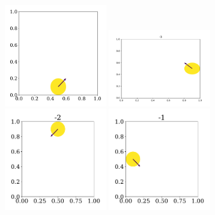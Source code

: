 \documentclass{article}
\begin{document}
    \begin{figure}[H]
        \centering
        \begin{subfigure}{.35\textwidth}
            \centering
            \includegraphics[width=0.49\textwidth]{../plots/test_case_one_particle/particle-4.pdf}
            \includegraphics[width=0.49\textwidth]{../plots/test_case_one_particle/particle-3.pdf}
            \includegraphics[width=0.49\textwidth]{../plots/test_case_one_particle/particle-2.pdf}
            \includegraphics[width=0.49\textwidth]{../plots/test_case_one_particle/particle-1.pdf}

\end{subfigure}
\end{figure}
\end{document}
